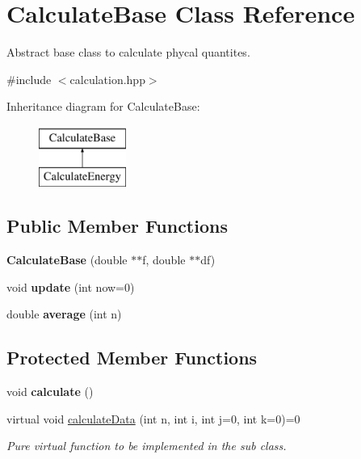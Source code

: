 \hypertarget{class_calculate_base}{}\section{Calculate\+Base Class Reference}
\label{class_calculate_base}


Abstract base class to calculate phycal quantites.  




{\ttfamily \#include $<$calculation.\+hpp$>$}

Inheritance diagram for Calculate\+Base\+:\begin{figure}[H]
\begin{center}
\leavevmode
\includegraphics[height=2.000000cm]{class_calculate_base}
\end{center}
\end{figure}
\subsection*{Public Member Functions}
\begin{DoxyCompactItemize}
\item 
\mbox{\label{class_calculate_base_a6ff55898f914b7d8843a44c19848dc63}} 
{\bfseries Calculate\+Base} (double $\ast$$\ast$f, double $\ast$$\ast$df)
\item 
\mbox{\label{class_calculate_base_aadbce95d114f18ccbbe752818223f604}} 
void {\bfseries update} (int now=0)
\item 
\mbox{\label{class_calculate_base_a9befdcb41010d4fb5e38891fb31c00a7}} 
double {\bfseries average} (int n)
\end{DoxyCompactItemize}
\subsection*{Protected Member Functions}
\begin{DoxyCompactItemize}
\item 
\mbox{\label{class_calculate_base_a9e56aaaaf9f0044049d37440fb135e2b}} 
void {\bfseries calculate} ()
\item 
\mbox{\label{class_calculate_base_a92d2b3012524704ffd8b87b5ac5a8888}} 
virtual void \mbox{\hyperlink{class_calculate_base_a92d2b3012524704ffd8b87b5ac5a8888}{calculate\+Data}} (int n, int i, int j=0, int k=0)=0
\begin{DoxyCompactList}\small\item\em Pure virtual function to be implemented in the sub class. \end{DoxyCompactList}\end{DoxyCompactItemize}
